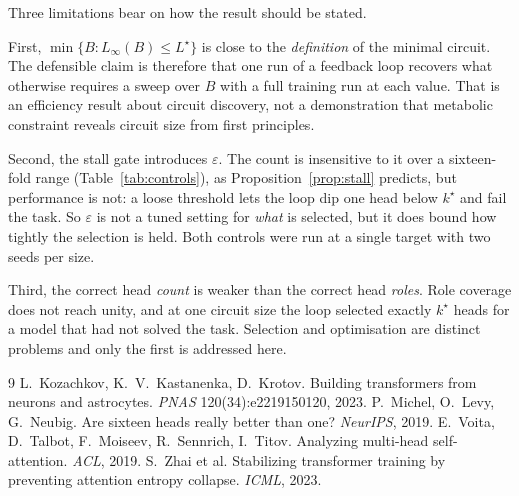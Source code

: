 \documentclass[11pt]{report}
\theoremstyle{plain}
\theoremstyle{definition}
\theoremstyle{remark}
\begin{document}
Three limitations bear on how the result should be stated.

First, $\min\{B : L_\infty(B) \le L^\star\}$ is close to the \emph{definition} of the
minimal circuit. The defensible claim is therefore that one run of a feedback loop
recovers what otherwise requires a sweep over $B$ with a full training run at each value.
That is an efficiency result about circuit discovery, not a demonstration that metabolic
constraint reveals circuit size from first principles.

Second, the stall gate introduces $\varepsilon$. The count is insensitive to it over a
sixteen-fold range (Table~\ref{tab:controls}), as Proposition~\ref{prop:stall} predicts,
but performance is not: a loose threshold lets the loop dip one head below $k^\star$ and
fail the task. So $\varepsilon$ is not a tuned setting for \emph{what} is selected, but it
does bound how tightly the selection is held. Both controls were run at a single target
with two seeds per size.

Third, the correct head \emph{count} is weaker than the correct head \emph{roles}. Role
coverage does not reach unity, and at one circuit size the loop selected exactly $k^\star$
heads for a model that had not solved the task. Selection and optimisation are distinct
problems and only the first is addressed here.

\begin{thebibliography}{9}
 L.~Kozachkov, K.~V.~Kastanenka, D.~Krotov.
  Building transformers from neurons and astrocytes. \emph{PNAS} 120(34):e2219150120, 2023.
 P.~Michel, O.~Levy, G.~Neubig.
  Are sixteen heads really better than one? \emph{NeurIPS}, 2019.
 E.~Voita, D.~Talbot, F.~Moiseev, R.~Sennrich, I.~Titov.
  Analyzing multi-head self-attention. \emph{ACL}, 2019.
 S.~Zhai et al.
  Stabilizing transformer training by preventing attention entropy collapse. \emph{ICML}, 2023.
\end{thebibliography}
\end{document}

